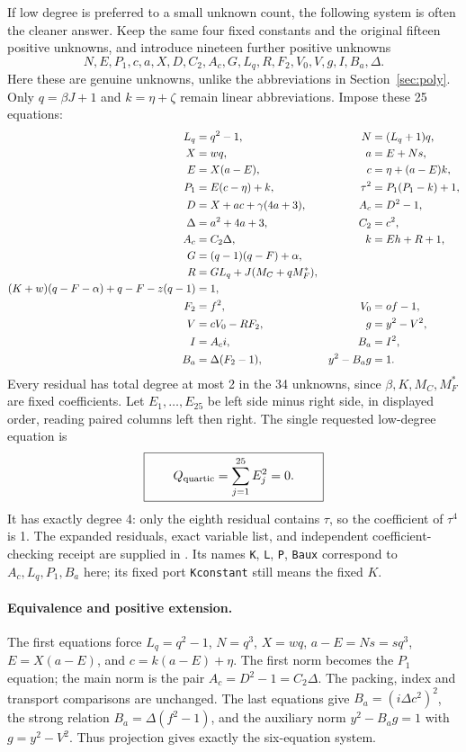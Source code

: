 \documentclass[11pt]{article}
\begin{document}
If low degree is preferred to a small unknown count, the following system is often the cleaner answer. Keep the same four fixed constants and the original fifteen positive unknowns, and introduce nineteen further positive unknowns
\[
 N,E,P_1,c,a,X,D,C_2,A_c,G,L_q,R,F_2,V_0,V,g,I,B_a,\Delta.
\]
Here these are genuine unknowns, unlike the abbreviations in Section~\ref{sec:poly}. Only \(q=\beta J+1\) and \(k=\eta+\zeta\) remain linear abbreviations. Impose these 25 equations:
\begin{alignat}{2}
 L_q&=q^2-1,&\qquad N&=(L_q+1)q,\notag\\
 X&=wq,&a&=E+Ns,\notag\\
 E&=X(a-E),&c&=\eta+(a-E)k,\notag\\
 P_1&=E(c-\eta)+k,&\tau^2&=P_1(P_1-k)+1,\notag\\
 D&=X+ac+\gamma(4a+3),&A_c&=D^2-1,\notag\\
 \Delta&=a^2+4a+3,&C_2&=c^2,\notag\\
 A_c&=C_2\Delta,&k&=Eh+R+1,\notag\\
 G&=(q-1)(q-F)+\alpha,\label{eq:quadratic1}\\
 R&=GL_q+J(M_C+qM_F^*),\notag\\
 (K+w)(q-F-\alpha)+q-F-z(q-1)&=1,\notag\\
 F_2&=f^2,&V_0&=of-1,\notag\\
 V&=cV_0-RF_2,&g&=y^2-V^2,\notag\\
 I&=A_ci,&B_a&=I^2,\notag\\
 B_a&=\Delta(F_2-1),&y^2-B_ag&=1.\notag
\end{alignat}
Every residual has total degree at most 2 in the 34 unknowns, since \(\beta,K,M_C,M_F^*\) are fixed coefficients. Let \(E_1,\ldots,E_{25}\) be left side minus right side, in displayed order, reading paired columns left then right. The single requested low-degree equation is
\begin{equation}\label{eq:quartic}
 \boxed{\qquad Q_{\rm quartic}=\sum_{j=1}^{25}E_j^2=0.\qquad}
\end{equation}
It has exactly degree 4: only the eighth residual contains \(\tau\), so the coefficient of \(\tau^4\) is 1. The expanded residuals, exact variable list, and independent coefficient-checking receipt are supplied in . Its names \texttt{K}, \texttt{L}, \texttt{P}, \texttt{Baux} correspond to \(A_c,L_q,P_1,B_a\) here; its fixed port \texttt{Kconstant} still means the fixed \(K\).

\paragraph{Equivalence and positive extension.}
The first equations force \(L_q=q^2-1\), \(N=q^3\), \(X=wq\), \(a-E=Ns=sq^3\), \(E=X(a-E)\), and \(c=k(a-E)+\eta\). The first norm becomes the \(P_1\) equation; the main norm is the pair \(A_c=D^2-1=C_2\Delta\). The packing, index and transport comparisons are unchanged. The last equations give \(B_a=(i\Delta c^2)^2\), the strong relation \(B_a=\Delta(f^2-1)\), and the auxiliary norm \(y^2-B_ag=1\) with \(g=y^2-V^2\). Thus projection gives exactly the six-equation system.
\end{document}
